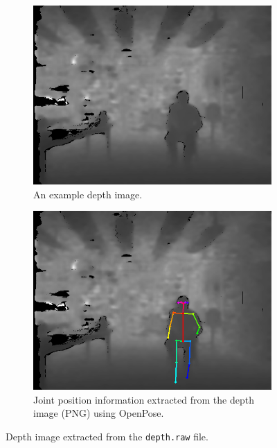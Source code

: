 \begin{figure}[H]
    \centering
    \begin{subfigure}[t]{0.49\textwidth}
        \includegraphics[width=\textwidth]{fig/4/depth-image.png}
        \caption{An example depth image.}
        \label{fig:depth-camera-frame}
    \end{subfigure}
    \hfill
    \begin{subfigure}[t]{0.49\textwidth}
        \includegraphics[width=\textwidth]{fig/4/depth-image-skeleton.png}
        \caption{Joint position information extracted from the depth image (PNG) using OpenPose\cite{openpose}.}
        \label{fig:depth-camera-frame-skeleton}
    \end{subfigure}
    \caption{Depth image extracted from the \texttt{depth.raw} file.}
\end{figure}

